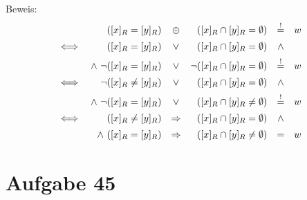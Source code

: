 \documentclass[10pt, oneside]{article}
\begin{document}
Beweis:
\begin{equation*}
    \begin{array}{rrcrcl}
                         &([x]_R = [y]_R) &\oplus&           ([x]_R \cap [y]_R    = \emptyset) &\overset{!}{=}& w \\[5pt]
        \iff             &([x]_R = [y]_R) &\lor&           ([x]_R \cap [y]_R    = \emptyset) &\land& \\[5pt]
             &\land\ \lnot([x]_R = [y]_R) &\lor&      \lnot([x]_R \cap [y]_R    = \emptyset) &\overset{!}{=}& w \\[5pt]
        \iff &\lnot([x]_R \neq [y]_R)     &\lor&           ([x]_R \cap [y]_R    = \emptyset) &\land& \\[5pt]
             &\land\ \lnot([x]_R = [y]_R) &\lor&           ([x]_R \cap [y]_R \neq \emptyset) &\overset{!}{=}& w \\[5pt]
        \iff             &([x]_R \neq [y]_R) &\Rightarrow& ([x]_R \cap [y]_R    = \emptyset) &\land& \\[5pt]
                  &\land\ ([x]_R = [y]_R)    &\Rightarrow& ([x]_R \cap [y]_R \neq \emptyset) &=& w
     \end{array}
\end{equation*}

\section{Aufgabe 45}
\end{document}
